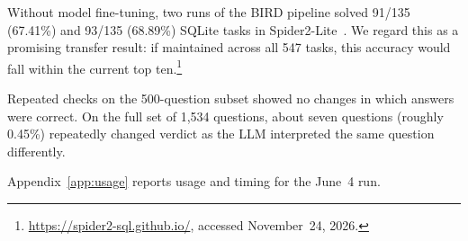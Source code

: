 Without model fine-tuning, two runs of the BIRD pipeline solved 91/135
(67.41\%) and 93/135 (68.89\%) SQLite tasks in Spider2-Lite~\cite{spider2}.
We regard this as a promising transfer result: if maintained across all
547 tasks, this accuracy would fall within the current top ten.\footnote{\url{https://spider2-sql.github.io/}, accessed November~24, 2026.}

Repeated checks on the 500-question subset showed no changes in which
answers were correct. On the full set of 1,534 questions, about seven
questions (roughly 0.45\%) repeatedly changed verdict as the LLM
interpreted the same question differently.

Appendix~\ref{app:usage} reports usage and timing for the June~4 run.
